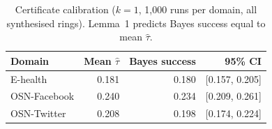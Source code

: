 \begin{table}[htbp]
\centering
\caption{Certificate calibration ($k=1$, 1{,}000 runs per domain, all synthesised rings). Lemma~1 predicts Bayes success equal to mean $\hat{\tau}$.}
\label{tab:calib}
\small
\begin{tabular}{lrrr}
\toprule
Domain & Mean $\hat{\tau}$ & Bayes success & 95\% CI\\
\midrule
E-health & 0.181 & 0.180 & [0.157, 0.205]\\
OSN-Facebook & 0.240 & 0.234 & [0.209, 0.261]\\
OSN-Twitter & 0.208 & 0.198 & [0.174, 0.224]\\
\bottomrule
\end{tabular}
\end{table}
